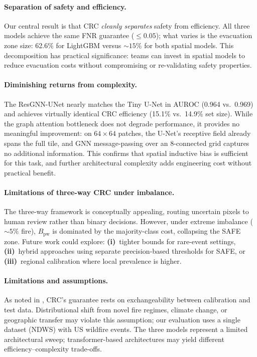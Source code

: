 \documentclass{article}
\begin{document}
\paragraph{Separation of safety and efficiency.}
Our central result is that CRC \emph{cleanly separates} safety from efficiency.
All three models achieve the same FNR guarantee (${\le}0.05$); what varies is the evacuation zone size: 62.6\% for LightGBM versus ${\sim}15\%$ for both spatial models.
This decomposition has practical significance: teams can invest in spatial models to reduce evacuation costs without compromising or re-validating safety properties.

\paragraph{Diminishing returns from complexity.}
The ResGNN-UNet nearly matches the Tiny U-Net in AUROC (0.964 vs.\ 0.969) and achieves virtually identical CRC efficiency (15.1\% vs.\ 14.9\% set size).
While the graph attention bottleneck does not degrade performance, it provides no meaningful improvement: on $64{\times}64$ patches, the U-Net's receptive field already spans the full tile, and GNN message-passing over an 8-connected grid captures no additional information.
This confirms that spatial inductive bias is sufficient for this task, and further architectural complexity adds engineering cost without practical benefit.

\paragraph{Limitations of three-way CRC under imbalance.}
The three-way framework is conceptually appealing, routing uncertain pixels to human review rather than binary decisions.
However, under extreme imbalance (${\sim}5\%$ fire), $B_{\mathrm{pw}}$ is dominated by the majority-class cost, collapsing the SAFE zone.
Future work could explore: \textbf{(i)}~tighter bounds for rare-event settings, \textbf{(ii)}~hybrid approaches using separate precision-based thresholds for SAFE, or \textbf{(iii)}~regional calibration where local prevalence is higher.

\paragraph{Limitations and assumptions.}
\label{sec:limitations}
As noted in , CRC's guarantee rests on exchangeability between calibration and test data.
Distributional shift from novel fire regimes, climate change, or geographic transfer may violate this assumption; our evaluation uses a single dataset (NDWS) with US wildfire events.
The three models represent a limited architectural sweep; transformer-based architectures may yield different efficiency--complexity trade-offs.
\end{document}
